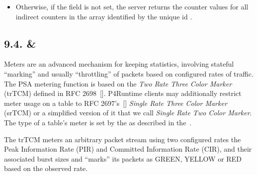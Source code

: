 \documentclass[11pt]{article}
\begin{document}
{\begin{itemize}
\item{}
Otherwise, if the  field is not set, the server returns the counter
values for all indirect counters in the array identified by the unique id
.%
\end{itemize}%

\subsection{9.4.\hspace*{0.5em} \& }\label{sec-meterentry-directmeterentry}%

\noindent{}Meters are an advanced mechanism for keeping statistics, involving stateful
\textquotedblleft{}marking\textquotedblright{} and usually \textquotedblleft{}throttling\textquotedblright{} of packets based on configured rates of
traffic. The PSA metering function is based on the \emph{Two Rate Three Color Marker}
(trTCM) defined in RFC 2698~[]. P4Runtime clients may additionally
restrict meter usage on a table to RFC 2697's~[] \emph{Single Rate Three
Color Marker} (srTCM) or a simplified version of it that we call \emph{Single Rate
Two Color Marker}. The type of a table's meter is set by the  as
described in the~.%

The trTCM meters an arbitrary packet stream using two configured rates \textemdash{}
the Peak Information Rate (PIR) and Committed Information Rate (CIR), and their
associated burst sizes \textemdash{} and \textquotedblleft{}marks\textquotedblright{} its packets as GREEN, YELLOW or RED based
on the observed rate.%

}
\end{document}

